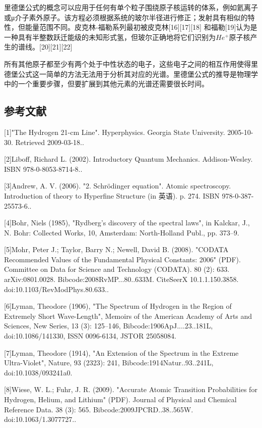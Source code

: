 里德堡公式的概念可以应用于任何有单个粒子围绕原子核运转的体系，例如氦离子或μ介子素外原子。该方程必须根据系统的玻尔半径进行修正；发射具有相似的特性，但能量范围不同。皮克林-福勒系列最初被皮克林[16][17][18] 和福勒[19]认为是一种具有半整数跃迁能级的未知形式氢，但玻尔正确地将它们识别为$He^+$原子核产生的谱线。[20][21][22]

所有其他原子都至少有两个处于中性状态的电子，这些电子之间的相互作用使得里德堡公式这一简单的方法无法用于分析其对应的光谱。里德堡公式的推导是物理学中的一个重要步骤，但要扩展到其他元素的光谱还需要很长时间。

\subsection{参考文献}
[1]"The Hydrogen 21-cm Line". Hyperphysics. Georgia State University. 2005-10-30. Retrieved 2009-03-18..

[2]Liboff, Richard L. (2002). Introductory Quantum Mechanics. Addison-Wesley. ISBN 978-0-8053-8714-8..


[3]Andrew, A. V. (2006). "2. Schrödinger equation". Atomic spectroscopy. Introduction of theory to Hyperfine Structure (in 英语). p. 274. ISBN 978-0-387-25573-6..

[4]Bohr, Niels (1985), "Rydberg's discovery of the spectral laws", in Kalckar, J., N. Bohr: Collected Works, 10, Amsterdam: North-Holland Publ., pp. 373–9.

[5]Mohr, Peter J.; Taylor, Barry N.; Newell, David B. (2008). "CODATA Recommended Values of the Fundamental Physical Constants: 2006" (PDF). Committee on Data for Science and Technology (CODATA). 80 (2): 633. arXiv:0801.0028. Bibcode:2008RvMP...80..633M. CiteSeerX 10.1.1.150.3858. doi:10.1103/RevModPhys.80.633..

[6]Lyman, Theodore (1906), "The Spectrum of Hydrogen in the Region of Extremely Short Wave-Length", Memoirs of the American Academy of Arts and Sciences, New Series, 13 (3): 125–146, Bibcode:1906ApJ....23..181L, doi:10.1086/141330, ISSN 0096-6134, JSTOR 25058084.

[7]Lyman, Theodore (1914), "An Extension of the Spectrum in the Extreme Ultra-Violet", Nature, 93 (2323): 241, Bibcode:1914Natur..93..241L, doi:10.1038/093241a0.

[8]Wiese, W. L.; Fuhr, J. R. (2009). "Accurate Atomic Transition Probabilities for Hydrogen, Helium, and Lithium" (PDF). Journal of Physical and Chemical Reference Data. 38 (3): 565. Bibcode:2009JPCRD..38..565W. doi:10.1063/1.3077727..

